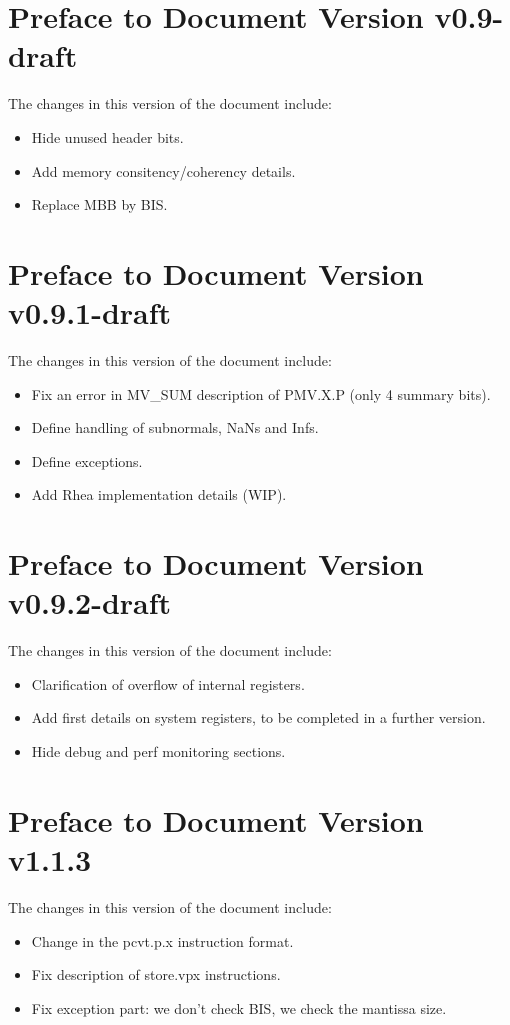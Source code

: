 \section*{Preface to Document Version v0.9-draft}

The changes in this version of the document include:
\vspace{-0.2in}
\begin{itemize}
\parskip 0pt
\itemsep 1pt
\item Hide unused header bits.
\item Add memory consitency/coherency details.
\item Replace MBB by BIS.
\end{itemize}

\section*{Preface to Document Version v0.9.1-draft}

The changes in this version of the document include:
\vspace{-0.2in}
\begin{itemize}
\parskip 0pt
\itemsep 1pt
\item Fix an error in MV\_SUM description of PMV.X.P (only 4 summary bits).
\item Define handling of subnormals, NaNs and Infs.
\item Define exceptions.
\item Add Rhea implementation details (WIP).
\end{itemize}

\section*{Preface to Document Version v0.9.2-draft}

The changes in this version of the document include:
\vspace{-0.2in}
\begin{itemize}
\parskip 0pt
\itemsep 1pt
\item Clarification of overflow of internal registers.
\item Add first details on system registers, to be completed in a further version.
\item Hide debug and perf monitoring sections.
\end{itemize}

\section*{Preface to Document Version v1.1.3}

The changes in this version of the document include:
\vspace{-0.2in}
\begin{itemize}
\parskip 0pt
\itemsep 1pt
\item Change in the pcvt.p.x instruction format.
\item Fix description of store.vpx instructions.
\item Fix exception part: we don't check BIS, we check the mantissa size.
\end{itemize}
